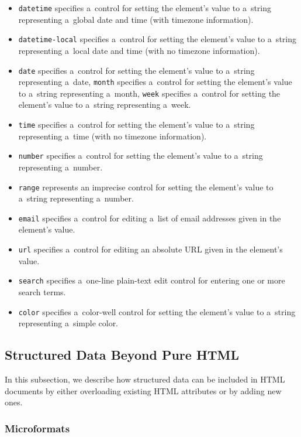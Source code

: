 \begin{itemize}
  \item \texttt{datetime} specifies a~control for setting the
        element’s value to a~string representing a~global date
        and time (with timezone information).
  \item \texttt{datetime-local} specifies a~control for setting
        the element’s value to a~string representing a~local date
        and time (with no timezone information).
  \item \texttt{date} specifies a~control for setting the 
        element’s value to a~string representing a~date,
        \texttt{month} specifies a~control for setting the
        element’s value to a~string representing a~month,
        \texttt{week} specifies a~control for setting the
        element’s value to a~string representing a~week.
  \item \texttt{time} specifies a~control for setting the
        element’s value to a~string representing a~time
        (with no timezone information).
  \item \texttt{number} specifies a~control for setting the
        element’s value to a~string representing a~number.
  \item \texttt{range} represents an imprecise control
        for setting the element’s value to a~string
        representing a~number.
  \item \texttt{email} specifies a~control for editing
        a~list of email addresses given in the element’s value.
  \item \texttt{url} specifies a~control for editing an
        absolute URL given in the element’s value.
  \item \texttt{search} specifies a~one-line plain-text
        edit control for entering one or more search terms.
  \item \texttt{color} specifies a~color-well control for
        setting the element’s value to a~string representing
        a~simple color.
\end{itemize}

\subsection{Structured Data Beyond Pure HTML}

In this subsection, we describe how structured data
can be included in HTML documents
by either overloading existing HTML attributes
or by adding new ones.

\subsubsection{Microformats}

